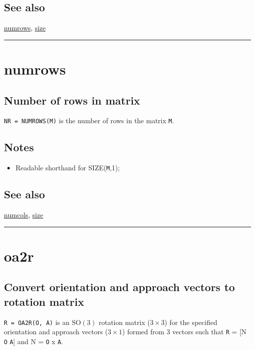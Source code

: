\subsection*{See also}


\hyperlink{numrows}{\color{blue} numrows}, \hyperlink{size}{\color{blue} size}

\vspace{1.5ex}\rule{\textwidth}{1mm}

\hypertarget{numrows}{\section*{numrows}}
\subsection*{Number of rows in matrix}


\texttt{NR = NUMROWS(M)} is the number of rows in the matrix \texttt{M}.


\subsection*{Notes}
\begin{itemize}
  \item Readable shorthand for SIZE(\texttt{M},1);
\end{itemize}

\subsection*{See also}


\hyperlink{numcols}{\color{blue} numcols}, \hyperlink{size}{\color{blue} size}

\vspace{1.5ex}\rule{\textwidth}{1mm}

\hypertarget{oa2r}{\section*{oa2r}}
\subsection*{Convert orientation and approach vectors to rotation matrix}


\texttt{R = OA2R(O, A)} is an $\mbox{SO}(3)$ rotation matrix ($3 \times 3$) for the specified
orientation and approach vectors ($3 \times 1$) formed from 3 vectors such that \texttt{R}
= [N \texttt{O} \texttt{A}] and N = \texttt{O} x \texttt{A}.


